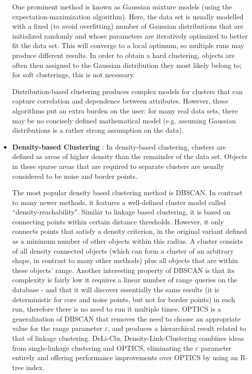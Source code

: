\begin{itemize}
One prominent method is known as Gaussian mixture models (using the expectation-maximization algorithm). Here,
the data set is usually modelled with a fixed (to avoid overfitting) number of Gaussian distributions that are
initialized randomly and whose parameters are iteratively optimized to better fit the data set. This will converge
to a local optimum, so multiple runs may produce different results. In order to obtain a hard clustering, objects
are often then assigned to the Gaussian distribution they most likely belong to; for soft clusterings, this is not
necessary.

Distribution-based clustering produces complex models for clusters that can capture correlation and dependence
between attributes. However, these algorithms put an extra burden on the user: for many real data sets, there may
be no concisely defined mathematical model (e.g. assuming Gaussian distributions is a rather strong assumption
on the data).

\item \textbf{Density-based Clustering} : In density-based clustering, clusters are defined as areas of higher density
than the remainder of the data set. Objects in these sparse areas that are required to separate clusters are usually
considered to be noise and border points.

The most popular density based clustering method is DBSCAN. In contrast to many newer methods, it features a well-defined
cluster model called ``density-reachability". Similar to linkage based clustering, it is based on connecting points within
certain distance thresholds. However, it only connects points that satisfy a density criterion, in the original variant
defined as a minimum number of other objects within this radius. A cluster consists of all density connected objects
(which can form a cluster of an arbitrary shape, in contrast to many other methods) plus all objects that are within
these objects' range. Another interesting property of DBSCAN is that its complexity is fairly low it requires a linear
number of range queries on the database - and that it will discover essentially the same results (it is deterministic
for core and noise points, but not for border points) in each run, therefore there is no need to run it multiple times.
OPTICS is a generalization of DBSCAN that removes the need to choose an appropriate value for the range parameter ${\varepsilon}$,
and produces a hierarchical result related to that of linkage clustering. DeLi-Clu, Density-Link-Clustering combines ideas
from single-linkage clustering and OPTICS, eliminating the ${\varepsilon}$ parameter entirely and offering performance improvements
over OPTICS by using an R-tree index.


\end{itemize}
